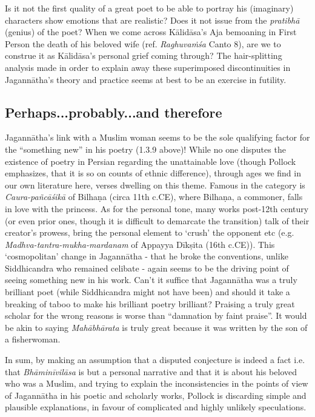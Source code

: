 Is it not the first quality of a great poet to be able to portray his (imaginary) characters show emotions that are realistic? Does it not issue from the {\sl pratibhā} (genius) of the poet? When we come across Kālidāsa’s Aja bemoaning in First Person the death of his beloved wife (ref. {\sl Raghuvaṁśa} Canto 8), are we to construe it as Kālidāsa’s personal grief coming through? The hair-splitting analysis made in order to explain away these superimposed discontinuities in Jagannātha’s theory and practice seems at best to be an exercise in futility.
\smallskip

\subsection{Perhaps...probably...and therefore}

Jagannātha’s link with a Muslim woman seems to be the sole qualifying factor for the “something new” in his poetry (1.3.9 above)! While no one disputes the existence of poetry in Persian regarding the unattainable love (though Pollock emphasizes, that it is so on counts of ethnic difference), through ages we find in our own literature here, verses dwelling on this theme. Famous in the category is {\sl Caura-pañcāśikā} of Bilhaṇa (circa 11th c.CE), where Bilhaṇa, a commoner, falls in love with the princess. As for the personal tone, many works post-12th century (or even prior ones, though it is difficult to demarcate the transition) talk of their creator’s prowess, bring the personal element to ‘crush’ the opponent etc (e.g. {\sl Madhva-tantra-mukha-mardanam} of Appayya Dīkṣita (16th c.CE)). This ‘cosmopolitan’ change in Jagannātha - that he broke the conventions, unlike Siddhicandra who remained celibate - again seems to be the driving point of seeing something new in his work. Can’t it suffice that Jagannātha was a truly brilliant poet (while Siddhicandra might not have been) and should it take a breaking of taboo to make his brilliant poetry brilliant? Praising a truly great scholar for the wrong reasons is worse than “damnation by faint praise”. It would be akin to saying {\sl Mahābhārata} is truly great because it was written by the son of a fisherwoman.

In sum, by making an assumption that a disputed conjecture is indeed a fact i.e. that {\sl Bhāminīvilāsa} is but a personal narrative and that it is about his beloved who was a Muslim, and trying to explain the inconsistencies in the points of view of Jagannātha in his poetic and scholarly works, Pollock is discarding simple and plausible explanations, in favour of complicated and highly unlikely speculations.

